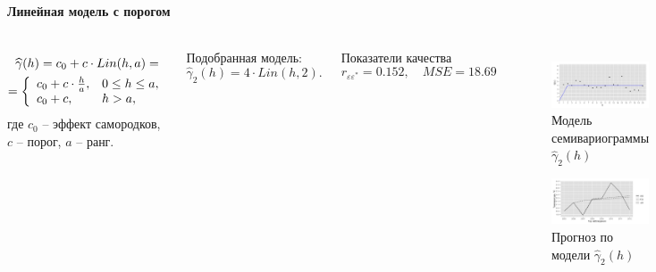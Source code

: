 \documentclass[10pt,pdf,aspectratio=169,hyperref={unicode},notheorems]{beamer}
\theoremstyle{definition}
\theoremstyle{example}
\theoremstyle{plain}
\begin{document}
\begin{frame}
  \frametitle{\large\subsecname}
  \framesubtitle{Линейная модель с порогом}
  \begin{columns}[c]
  \column{3in}
  \begin{equation}\begin{gathered}
  \label{eq:linsill}
    \widehat{\gamma}(h) = c_0 + c \cdot Lin(h, a) = \\
    = \left\{
    \begin{array}{l l}
     c_0 + c \cdot \frac{h}{a}, & 0 \leq h \leq a, \\
     c_0 + c, & h > a,
    \end{array} \right.
  \end{gathered}\end{equation}
  где $ c_0 $ -- эффект самородков, $ c $ -- порог, $ a $ -- ранг.

  \vspace{0.5em}

  Подобранная модель:
  \begin{equation}
  \label{eq:gamma4}
    \widehat{\gamma}_2(h) = 4 \cdot Lin(h, 2).
  \end{equation}

  Показатели качества
  \begin{equation*}
    r_{\varepsilon\varepsilon^{*}} = 0.152, \quad MSE = 18.69
  \end{equation*}

  \column{3in}
  \vspace{-14.5pt}
  \begin{figure}[H]
    \includegraphics[width=0.9\linewidth]{../../figures/variogram/lin-fit-adapt-modeled.png} \\
    \caption{Модель семивариограммы $\widehat{\gamma}_2(h)$}
    \includegraphics[width=0.9\linewidth]{../../figures/variogram/lin-fit-adapt-cross-prediction.png}
    \caption{Прогноз по модели $\widehat{\gamma}_2(h)$}
  \end{figure}
  \end{columns}
\end{frame}
\end{document}
